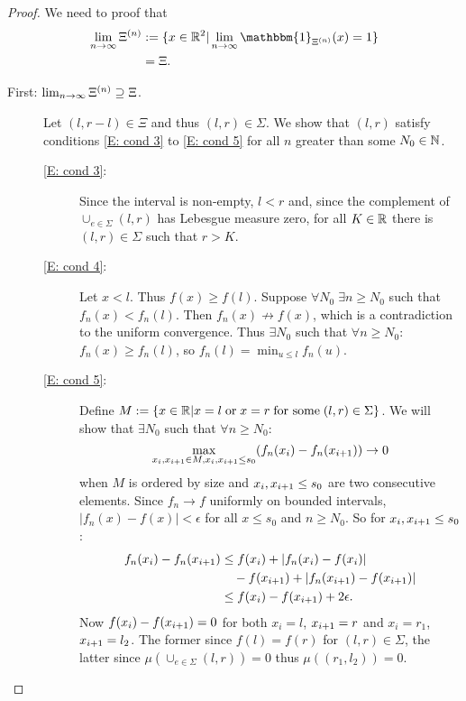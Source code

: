 \begin{proof}
We need to proof that
\begin{equation}
\begin{aligned}
\lim_{n \rightarrow \infty} \Xin 
&:= \lbrace x \in \Real^2 | \lim_{n \rightarrow \infty} \mathbbm{1}_{\Xin}(x) = 1 \rbrace \\ 
&= \Xi.
\end{aligned}
\end{equation}
\begin{description} %
\item[First: $\lim_{n \rightarrow \infty} \Xi^{(n)} \supseteq \Xi$.] 
Let $(l, r-l) \in \Xi$ and thus $(l, r) \in \Sigma$.
We show that $(l,r)$ satisfy conditions \ref{E: cond 3} to \ref{E: cond 5} for all $n$ greater than some $N_0 \in \mathbb{N}$.

\begin{description} %
	\item[\ref{E: cond 3}:] 
Since the interval is non-empty, $l < r$ 
and, since the complement of $\cup_{e \in \Sigma} (l,r)$ has Lebesgue measure zero,
for all $K \in \mathbb{R}$ there is $(l,r) \in \Sigma$ such that $r > K$.
	\item[\ref{E: cond 4}:]
Let $x < l$. Thus $f(x) \geq f(l)$. 
Suppose $\forall N_0 \; \exists n \geq N_0$ such that
$f_n(x) < f_n(l)$.
Then $f_n(x) \nrightarrow f(x)$, 
which is a contradiction to the uniform convergence.
Thus $\exists N_0$ such that $\forall n \geq N_0$: 
$f_n(x) \geq f_n(l)$, so
$f_n(l) = \min_{u \leq l}f_n(u)$.
	\item[\ref{E: cond 5}:]
Define $M:=\lbrace x \in \mathbb{R} | x=l \; \text{or} \; x=r \; \text{for some} \; (l,r) \in \Sigma \rbrace$.
We will show that $\exists N_0$ such that $\forall n \geq N_0$:
\begin{equation*}
\max_{x_i, x_{i+1} \in M, x_i, x_{i+1} \leq s_0} (f_n(x_i) - f_n(x_{i+1})) \rightarrow 0
\end{equation*}
when $M$ is ordered by size and $x_i, x_{i+1} \leq s_0$ are two consecutive elements.
Since $f_n \rightarrow f$ uniformly on bounded intervals, 
$|f_n(x) - f(x)| < \epsilon$ for all $x \leq s_0$ and $n \geq N_0$.
So for $x_i, x_{i+1} \leq s_0$:
\begin{equation}
\begin{aligned}
f_n(x_i) - f_n(x_{i+1}) 
&\leq f(x_i) + |f_n(x_i) - f(x_i)| \\
&\quad - f(x_{i+1}) + |f_n(x_{i+1}) -f(x_{i+1})| \\
&\leq f(x_i) - f(x_{i+1}) + 2\epsilon.
\end{aligned} 
\end{equation}
Now $f(x_i) - f(x_{i+1}) = 0$ for both $x_i = l$, $x_{i+1} = r$ 
and $x_i = r_1$, $x_{i+1} = l_2$. 
The former since $f(l) = f(r)$ for $(l,r) \in \Sigma$,
the latter since $\mu \left(\cup_{e \in \Sigma} (l,r)\right) = 0$
thus $\mu \left( (r_1, l_2) \right) = 0$.


\end{description}
\end{description}
\end{proof}
